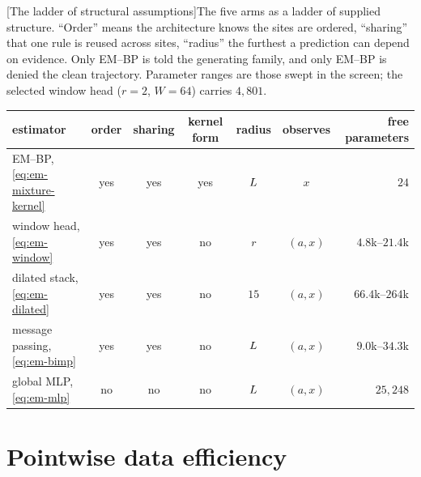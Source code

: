 \begin{center}
\begin{minipage}{\linewidth}\small\centering
{}[The ladder of structural assumptions]{The five arms as a
ladder of supplied structure. ``Order'' means the architecture knows the
sites are ordered, ``sharing'' that one rule is reused across sites,
``radius'' the furthest a prediction can depend on evidence. Only EM--BP is
told the generating family, and only EM--BP is denied the clean trajectory.
Parameter ranges are those swept in the screen; the selected window head
($r = 2$, $W = 64$) carries $4{,}801$.}
\label{tab:em-architectures}
\begin{tabular}{@{}lcccccr@{}}
\toprule
estimator & order & sharing & kernel form & radius & observes & free parameters \\
\midrule
EM--BP, \eqref{eq:em-mixture-kernel} & yes & yes & yes & $L$ & $x$ & $24$ \\
window head, \eqref{eq:em-window} & yes & yes & no & $r$ & $(a,x)$ & $4.8$k--$21.4$k \\
dilated stack, \eqref{eq:em-dilated} & yes & yes & no & $15$ & $(a,x)$ & $66.4$k--$264$k \\
message passing, \eqref{eq:em-bimp} & yes & yes & no & $L$ & $(a,x)$ & $9.0$k--$34.3$k \\
global MLP, \eqref{eq:em-mlp} & no & no & no & $L$ & $(a,x)$ & $25{,}248$ \\
\bottomrule
\end{tabular}
\end{minipage}
\end{center}

\section{Pointwise data efficiency}\label{sec:em-pointwise}

